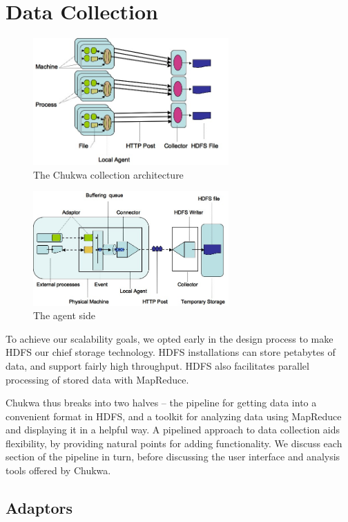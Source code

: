 \documentclass[letterpaper,twocolumn,10pt]{article}
\begin{document}
\section{Data Collection}

\begin{figure}
 \includegraphics[width=75mm]{chukwa0.jpg}
\caption{The Chukwa collection architecture} 
\end{figure}

\begin{figure}
  \includegraphics[width=75mm]{chukwa1.jpg}
\caption{The agent side}
\end{figure}

To achieve our scalability goals, we opted early in the design process to make HDFS our chief storage technology. HDFS installations can store petabytes of data, and support fairly high throughput. HDFS also facilitates parallel processing of stored data with MapReduce.

Chukwa thus breaks into two halves -- the pipeline for getting data into a convenient format in HDFS, and a toolkit for analyzing data using MapReduce and displaying it in a helpful way. A pipelined approach to data collection aids flexibility, by providing natural points for adding functionality. We discuss each section of the pipeline in turn, before discussing the user interface and analysis tools offered by Chukwa.

\subsection{Adaptors}
\end{document}
